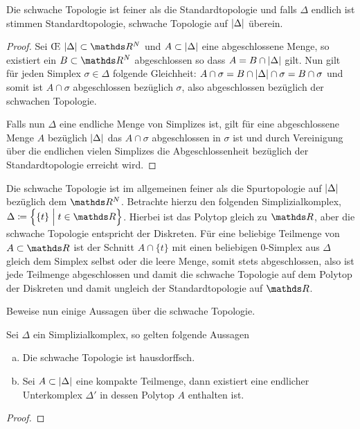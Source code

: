 \begin{Lem}
  Die schwache Topologie ist feiner als die Standardtopologie und
  falls $\Delta$ endlich ist stimmen Standardtopologie, schwache
  Topologie auf $\left| \Delta \right|$ überein.
  \begin{proof}
    Sei \OE\; $\gr{\Delta} \subset \R^N$ und $A \subset \left| \Delta \right|$
    eine abgeschlossene Menge, so existiert ein $B \subset \R^N$
    abgeschlossen so dass $A = B \cap \left| \Delta \right|$ gilt. Nun gilt für
    jeden Simplex $\sigma \in \Delta$ folgende Gleichheit:
    $A \cap \sigma = B \cap \left| \Delta \right| \cap \sigma = B \cap \sigma$
    und somit ist $A \cap \sigma$ abgeschlossen bezüglich $\sigma$,
    also abgeschlossen bezüglich der schwachen Topologie.
		
    Falls nun $\Delta$ eine endliche Menge von Simplizes ist, gilt für
    eine abgeschlossene Menge $A$ bezüglich $\left| \Delta \right|$ das
    $A \cap \sigma$ abgeschlossen in $\sigma$ ist und durch
    Vereinigung über die endlichen vielen Simplizes die
    Abgeschlossenheit bezüglich der Standardtopologie erreicht wird.
  \end{proof}
\end{Lem}

\begin{Bem}
  Die schwache Topologie ist im allgemeinen feiner als die
  Spurtopologie auf $\left| \Delta \right|$ bezüglich dem $\R^N$. Betrachte
  hierzu den folgenden Simplizialkomplex,
  $\Delta \coloneqq \set{ \{t\} }{t \in \R}$.  Hierbei ist das
  Polytop gleich zu $\R$, aber die schwache
  Topologie entspricht der Diskreten. Für eine beliebige
  Teilmenge von $A \subset \R$ ist der Schnitt $A \cap \{ t \}$ mit
  einen beliebigen $0$-Simplex aus $\Delta$ gleich dem Simplex selbst oder die leere Menge,
  somit stets abgeschlossen, also ist jede Teilmenge abgeschlossen und
  damit die schwache Topologie auf dem Polytop der Diskreten und
  damit ungleich der Standardtopologie auf $\R$.
\end{Bem}

Beweise nun einige Aussagen über die schwache Topologie.

\begin{Satz}
  Sei $\Delta$ ein Simplizialkomplex, so gelten folgende Aussagen
  \begin{enumerate}[(a)]
        \item Die schwache Topologie ist hausdorffsch.
        \item Sei $A \subset \left| \Delta \right|$ eine kompakte Teilmenge,
          dann existiert eine endlicher Unterkomplex $\Delta'$ in
          dessen Polytop $A$ enthalten ist.
	\end{enumerate}
	\begin{proof}
	\end{proof}
\end{Satz}

